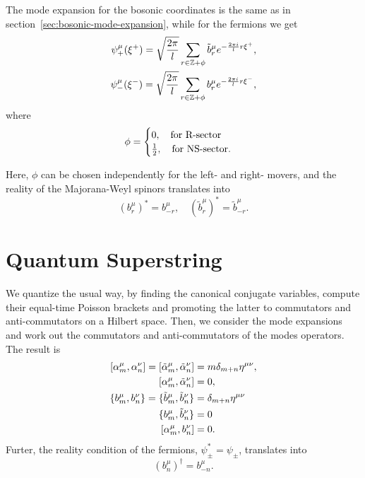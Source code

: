 The mode expansion for the bosonic coordinates is the same as in section~\ref{sec:bosonic-mode-expansion}, while for the fermions we get
\begin{equation}
\begin{aligned}
    \psi^\mu_+ (\xi^+) = \sqrt{\frac{2\pi}{l}} \sum_{r \in \mathbb{Z} + \phi} \tilde{b}^\mu_r e ^{-\frac{2\pi i}{l} r \xi^+} , \\
    \psi^\mu_- (\xi^-) = \sqrt{\frac{2\pi}{l}} \sum_{r \in \mathbb{Z} + \phi} {b}^\mu_r e ^{-\frac{2\pi i}{l} r \xi^-} ,
\end{aligned}
\end{equation}
where
\begin{equation}\label{eq:phi-sectors}
    \phi = \begin{cases}
        0, \quad \textup{for R-sector} \\
        \frac{1}{2}, \quad \textup{for NS-sector} .
    \end{cases}
\end{equation}

Here, $\phi$ can be chosen independently for the left- and right- movers, and the reality of the Majorana-Weyl spinors translates into
\begin{equation}\label{eq:reality-condition}
    (b^\mu_r)^* = b^\mu_{-r}, \quad (\tilde{b}^\mu_r)^* = \tilde{b}^\mu_{-r}.
\end{equation}

\section{Quantum Superstring}
We quantize the usual way, by finding the canonical conjugate variables, compute their equal-time Poisson brackets and promoting the latter to commutators and anti-commutators on a Hilbert space. Then, we consider the mode expansions and work out the commutators and anti-commutators of the modes operators. The result is
\begin{subequations}
\begin{align}
    \comm{\alpha^\mu_m}{\alpha^\nu_n} = \comm{\tilde{\alpha}^\mu_m}{\tilde{\alpha}^\nu_n} &= m \delta_{m+n} \eta^{\mu\nu} , \\
    \comm{\alpha^\mu_m}{\tilde{\alpha}^\nu_n} &= 0, \\
    \{ b^\mu_m, b^\nu_n \} = \{ \tilde{b}^\mu_m, \tilde{b}^\nu_n \} &= \delta_{m+n} \eta^{\mu\nu} \label{eq:anticomm-bs} \\
    \{ b^\mu_m, \tilde{b}^\nu_n \} &= 0 \\
    \comm{\alpha^\mu_m}{b^\nu_n} &= 0 .
\end{align}
\end{subequations}
Furter, the reality condition of the fermions, $\psi^*_\pm = \psi_\pm$, translates into
\begin{equation}
    (b^\mu_n)^\dagger = b^\mu_{-n} .
\end{equation}

